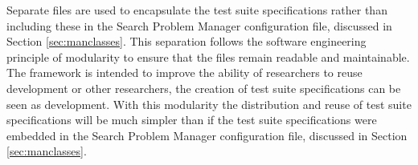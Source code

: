 Separate files are used to encapsulate the test suite specifications rather than including these in the Search Problem Manager configuration file, discussed in Section \ref{sec:manclasses}.
This separation follows the software engineering principle of modularity to ensure that the files remain readable and maintainable.
The framework is intended to improve the ability of researchers to reuse development or other researchers, the creation of test suite specifications can be seen as development.
With this modularity the distribution and reuse of test suite specifications will be much simpler than if the test suite specifications were embedded in the Search Problem Manager configuration file, discussed in Section \ref{sec:manclasses}.

% 

